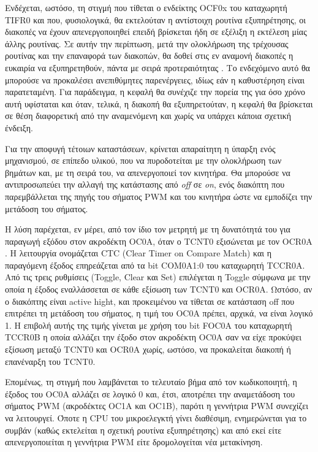 Ενδέχεται, ωστόσο, τη στιγμή που τίθεται ο ενδείκτης OCF0x του καταχωρητή TIFR0
και που, φυσιολογικά, θα εκτελούταν η αντίστοιχη ρουτίνα εξυπηρέτησης, οι
διακοπές να έχουν απενεργοποιηθεί επειδή βρίσκεται ήδη σε εξέλιξη η εκτέλεση
μίας άλλης ρουτίνας. Σε αυτήν την περίπτωση, μετά την ολοκλήρωση της τρέχουσας
ρουτίνας και την επαναφορά των διακοπών, θα δοθεί στις εν αναμονή διακοπές η
ευκαιρία να εξυπηρετηθούν, πάντα με σειρά προτεραιότητας
\parencite[13--14,57]{atmel13}. Το ενδεχόμενο αυτό θα μπορούσε να προκαλέσει
ανεπιθύμητες παρενέργειες, ιδίως εάν η καθυστέρηση είναι παρατεταμένη. Για
παράδειγμα, η κεφαλή θα συνέχιζε την πορεία της για όσο χρόνο αυτή υφίσταται και
όταν, τελικά, η διακοπή θα εξυπηρετούταν, η κεφαλή θα βρίσκεται σε θέση
διαφορετική από την αναμενόμενη και χωρίς να υπάρχει κάποια σχετική ένδειξη.

Για την αποφυγή τέτοιων καταστάσεων, κρίνεται απαραίτητη η ύπαρξη ενός
μηχανισμού, σε επίπεδο υλικού, που να πυροδοτείται με την ολοκλήρωση των βημάτων
και, με τη σειρά του, να απενεργοποιεί τον κινητήρα. Θα μπορούσε να
αντιπροσωπεύει την αλλαγή της κατάστασης από \emph{off} σε \emph{on}, ενός
διακόπτη που παρεμβάλλεται της πηγής του σήματος PWM και του κινητήρα ώστε να
εμποδίζει την μετάδοση του σήματος.

Η λύση παρέχεται, εν μέρει, από τον ίδιο τον μετρητή με τη δυνατότητά του για
παραγωγή εξόδου στον ακροδέκτη OC0A, όταν ο TCNT0 εξισώνεται με τον OCR0A
\parencite[98--99,107]{atmel13}. Η λειτουργία ονομάζεται CTC (\textenglish{Clear
Timer on Compare Match}) και η παραγόμενη έξοδος επηρεάζεται από τα bit COM0A1:0
του καταχωρητή TCCR0A. Από τις τρεις ρυθμίσεις (\textenglish{Toggle, Clear} και
\textenglish{Set}) επιλέγεται η \textenglish{Toggle} σύμφωνα με την οποία η
έξοδος εναλλάσσεται σε κάθε εξίσωση των TCNT0 και OCR0A. Ωστόσο, αν ο διακόπτης
είναι \textenglish{active hight}, και προκειμένου να τίθεται σε κατάσταση
\textenglish{off} που επιτρέπει τη μετάδοση του σήματος, η τιμή του OC0A πρέπει,
αρχικά, να είναι λογικό 1. Η επιβολή αυτής της τιμής γίνεται με χρήση του bit
FOC0A του καταχωρητή TCCR0B η οποία αλλάζει την έξοδο στον ακροδέκτη OC0A σαν
να είχε προκύψει εξίσωση μεταξύ TCNT0 και OCR0A χωρίς, ωστόσο, να προκαλείται
διακοπή ή επανέναρξη του TCNT0.

Επομένως, τη στιγμή που λαμβάνεται το τελευταίο βήμα από τον κωδικοποιητή, η
έξοδος του OC0A αλλάζει σε λογικό 0 και, έτσι, αποτρέπει την αναμετάδοση του
σήματος PWM (ακροδέκτες OC1A και OC1B), παρότι η γεννήτρια PWM συνεχίζει να
λειτουργεί. Όποτε η CPU του μικροελεγκτή γίνει διαθέσιμη, ενημερώνεται για το
συμβάν (καθώς εκτελείται η σχετική ρουτίνα εξυπηρέτησης) και από εκεί είτε
απενεργοποιείται η γεννήτρια PWM είτε δρομολογείται νέα μετακίνηση.

